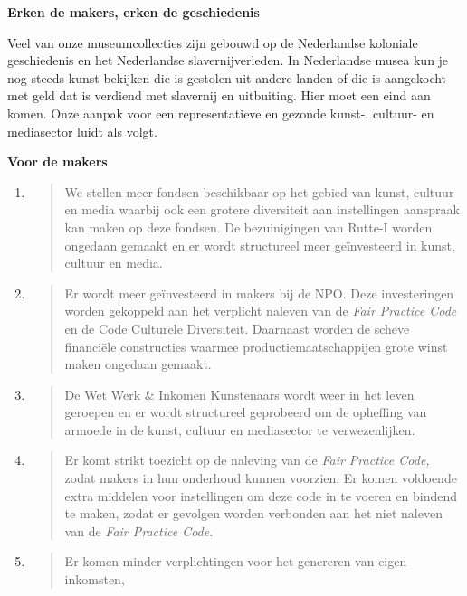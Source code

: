 \textbf{Erken de makers, erken de geschiedenis}

Veel van onze museumcollecties zijn gebouwd op de Nederlandse koloniale
geschiedenis en het Nederlandse slavernijverleden. In Nederlandse musea
kun je nog steeds kunst bekijken die is gestolen uit andere landen of
die is aangekocht met geld dat is verdiend met slavernij en uitbuiting.
Hier moet een eind aan komen. Onze aanpak voor een representatieve en
gezonde kunst-, cultuur- en mediasector luidt als volgt.

\textbf{Voor de makers}

\begin{enumerate}
\def\labelenumi{\arabic{enumi}.}
\item
  \begin{quote}
  We stellen meer fondsen beschikbaar op het gebied van kunst, cultuur
  en media waarbij ook een grotere diversiteit aan instellingen
  aanspraak kan maken op deze fondsen. De bezuinigingen van Rutte-I
  worden ongedaan gemaakt en er wordt structureel meer geïnvesteerd in
  kunst, cultuur en media.
  \end{quote}
\item
  \begin{quote}
  Er wordt meer geïnvesteerd in makers bij de NPO. Deze investeringen
  worden gekoppeld aan het verplicht naleven van de \emph{Fair Practice
  Code} en de Code Culturele Diversiteit. Daarnaast worden de scheve
  financiële constructies waarmee productiemaatschappijen grote winst
  maken ongedaan gemaakt.
  \end{quote}
\item
  \begin{quote}
  De Wet Werk \& Inkomen Kunstenaars wordt weer in het leven geroepen en
  er wordt structureel geprobeerd om de opheffing van armoede in de
  kunst, cultuur en mediasector te verwezenlijken.
  \end{quote}
\item
  \begin{quote}
  Er komt strikt toezicht op de naleving van de \emph{Fair Practice
  Code,} zodat makers in hun onderhoud kunnen voorzien. Er komen
  voldoende extra middelen voor instellingen om deze code in te voeren
  en bindend te maken, zodat er gevolgen worden verbonden aan het niet
  naleven van de \emph{Fair Practice Code}.
  \end{quote}
\item
  \begin{quote}
  Er komen minder verplichtingen voor het genereren van eigen inkomsten,

\end{quote}
\end{enumerate}
